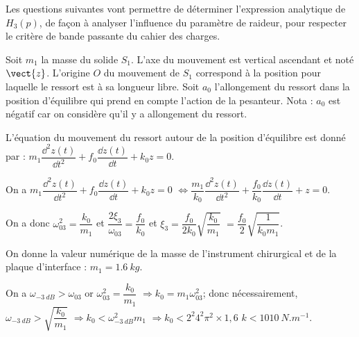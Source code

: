 \begin{multicols}{2}
Les questions suivantes vont permettre de déterminer l’expression analytique de $H_3(p)$, de façon à analyser l’influence du paramètre de raideur, pour respecter le critère de bande passante du cahier des charges.

Soit $m_1$ la masse du solide $S_1$. L’axe du mouvement est vertical ascendant et noté $\vect{z}$. L’origine $O$ du mouvement de $S_1$ correspond à la position pour laquelle le ressort est à sa longueur libre.
Soit $a_0$ l’allongement du ressort dans la position d’équilibre qui prend en compte l’action de la pesanteur. 
Nota : $a_0$ est négatif car on considère qu’il y a allongement du ressort.

L'équation du mouvement du ressort autour de la position d'équilibre est donné par : $m_1\dfrac{\dd^2 z(t)}{\dd t^2} + f_0 \dfrac{\dd z (t)}{\dd t}+k_0 z = 0$.

\ifprof
\begin{corrige}
On a  $m_1\dfrac{\dd^2 z(t)}{\dd t^2} + f_0 \dfrac{\dd z (t)}{\dd t}+k_0 z = 0$ 
$\Leftrightarrow  \dfrac{m_1}{k_0}\dfrac{\dd^2 z(t)}{\dd t^2} + \dfrac{f_0}{k_0} \dfrac{\dd z (t)}{\dd t}+ z = 0$. 

On a donc $\omega_{03}^2=\dfrac{k_0}{m_1}$ et $\dfrac{2\xi_3}{\omega_{03}}=\dfrac{f_0}{k_0}$ et $\xi_3 =\dfrac{f_0}{2k_0}\sqrt {\dfrac{k_0}{m_1}}$ $=\dfrac{f_0}{2}\sqrt {\dfrac{1}{k_0m_1}}$.
\end{corrige}
\else
\fi

On donne la valeur numérique de la masse de l’instrument chirurgical et de la plaque d’interface : $m_1 = \SI{1,6}{kg}$.


\ifprof
\begin{corrige}
On a $ \omega_{-\SI{3}{dB}}> \omega_{03}$ or $\omega_{03}^2=\dfrac{k_0}{m_1}$ $\Rightarrow k_0= m_1 \omega_{03}^2$; donc nécessairement, $ \omega_{-\SI{3}{dB}}>\sqrt{\dfrac{k_0}{m_1}}$ $\Rightarrow k_0 <\omega_{-\SI{3}{dB}} ^2 m_1 $ $\Rightarrow k_0 <2^2 4^2 \pi^2 \times 1,6 $ $k<\SI{1010}{N.m^{-1}}$.
\end{corrige}
\else
\fi


\end{multicols}
